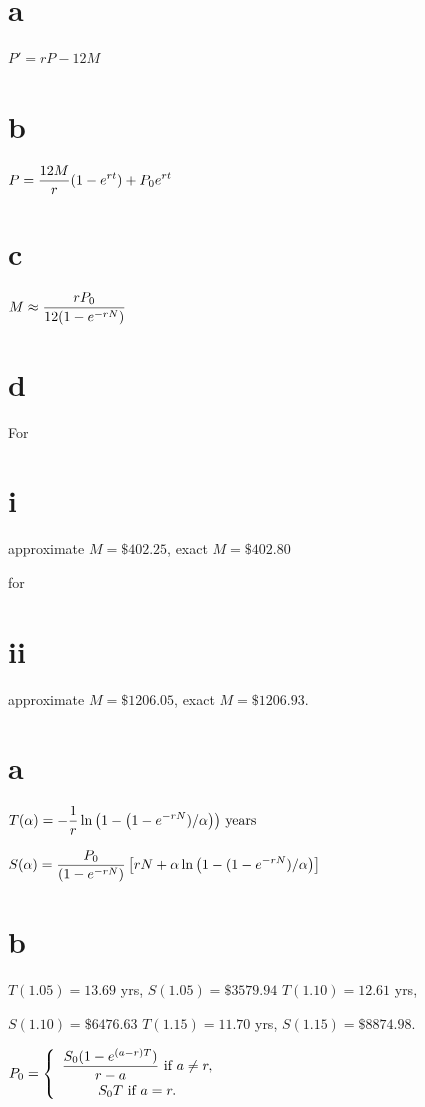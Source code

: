 \part{a} $P'=rP-12M$
\part{b} $\displaystyle{P=\frac{12M}{r}(1-e^{rt})+P_{0}e^{rt}}$
\part{c}  $\displaystyle{M\approx\frac{rP_{0}}{12(1-e^{-rN})}}$

\quad \quad \part{d}  For \part{i} approximate $M=\$402.25$, exact
$M=\$402.80$

\quad \quad  for \part{ii} approximate $M=\$1206.05$, exact $M=\$1206.93$.

\part{a} $T(\alpha)=\displaystyle{-\frac{1}{r}\ln\left(1-\left(1-e^{-rN})/\alpha\right)\right)}\mbox{ years}$

\quad \quad $S(\alpha)=\displaystyle{\frac{P_{0}}{(1-e^{-rN})}\left[rN+\alpha\ln
\left(1-(1-e^{-rN})/\alpha\right)\right]}$

\part{b}
$T(1.05)=13.69$ yrs, $S(1.05)=\$3579.94$
$T(1.10)=12.61$ yrs,

\quad\;    $S(1.10)=\$6476.63$
$T(1.15)=11.70$ yrs, $S(1.15)=\$8874.98$.

$P_{0}=\left\{\begin{array}{cl}\displaystyle\frac{S_{0}(1-e^{(a-r)T})}{r-a}
\mbox{ if }a\ne r,\\[6pt]S_{0}T\mbox{ if }a=r.\end{array}\right. $

